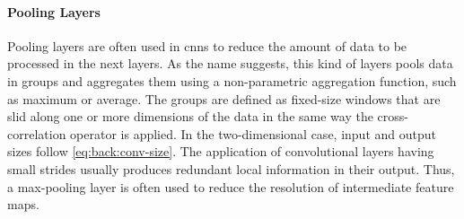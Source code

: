 \paragraph{Pooling Layers}
Pooling layers are often used in \glspl{cnn} to reduce the amount of data to be processed in the next layers.
As the name suggests, this kind of layers pools data in groups and aggregates them using a non-parametric aggregation function, such as maximum or average.
The groups are defined as fixed-size windows that are slid along one or more dimensions of the data in the same way the cross-correlation operator is applied.
In the two-dimensional case, input and output sizes follow \ref{eq:back:conv-size}.
The application of convolutional layers having small strides usually produces redundant local information in their output.
Thus, a max-pooling layer is often used to reduce the resolution of intermediate feature maps.


